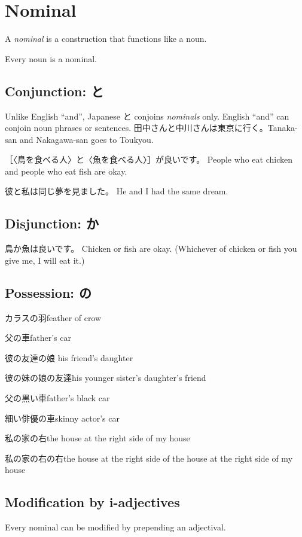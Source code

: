 \chapter{Nominal}

A \emph{nominal} is a construction that functions like a noun.

Every noun is a nominal.

\section{Conjunction: と}

Unlike English ``and'', Japanese と conjoins \emph{nominals} only.
English ``and'' can conjoin noun phrases or sentences.
田中さんと中川さんは東京に行く。Tanaka-san and Nakagawa-san goes to Toukyou.

［〈鳥を食べる人〉と〈魚を食べる人〉］が良いです。
People who eat chicken and people who eat fish are okay.

彼と私は同じ夢を見ました。
He and I had the same dream.

\section{Disjunction: か}

鳥か魚は良いです。
Chicken or fish are okay.
(Whichever of chicken or fish you give me, I will eat it.)

\section{Possession: の}

カラスの羽feather of crow

父の車father's car

彼の友達の娘 his friend's daughter

彼の妹の娘の友達his younger sister's daughter's friend

父の黒い車father's black car

細い俳優の車skinny actor's car

私の家の右the house at the right side of my house

私の家の右の右the house at the right side of the house at the right side of my house

\section{Modification by i-adjectives}

Every nominal can be modified by prepending an adjectival.

